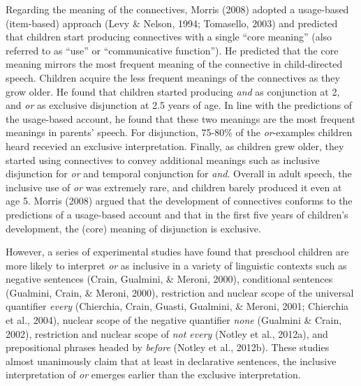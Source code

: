 \documentclass[,man,floatsintext]{apa6}
\begin{document}
Regarding the meaning of the connectives, Morris (2008) adopted a usage-based (item-based) approach (Levy \& Nelson, 1994; Tomasello, 2003) and predicted that children start producing connectives with a single \enquote{core meaning} (also referred to as \enquote{use} or \enquote{communicative function}). He predicted that the core meaning mirrors the most frequent meaning of the connective in child-directed speech. Children acquire the less frequent meanings of the connectives as they grow older. He found that children started producing \emph{and} as conjunction at 2, and \emph{or} as exclusive disjunction at 2.5 years of age. In line with the predictions of the usage-based account, he found that these two meanings are the most frequent meanings in parents' speech. For disjunction, 75-80\% of the \emph{or}-examples children heard recevied an exclusive interpretation. Finally, as children grew older, they started using connectives to convey additional meanings such as inclusive disjunction for \emph{or} and temporal conjunction for \emph{and}. Overall in adult speech, the inclusive use of \emph{or} was extremely rare, and children barely produced it even at age 5. Morris (2008) argued that the development of connectives conforms to the predictions of a usage-based account and that in the first five years of children's development, the (core) meaning of disjunction is exclusive.

However, a series of experimental studies have found that preschool children are more likely to interpret \emph{or} as inclusive in a variety of linguistic contexts such as negative sentences (Crain, Gualmini, \& Meroni, 2000), conditional sentences (Gualmini, Crain, \& Meroni, 2000), restriction and nuclear scope of the universal quantifier \emph{every} (Chierchia, Crain, Guasti, Gualmini, \& Meroni, 2001; Chierchia et al., 2004), nuclear scope of the negative quantifier \emph{none} (Gualmini \& Crain, 2002), restriction and nuclear scope of \emph{not every} (Notley et al., 2012a), and prepositional phrases headed by \emph{before} (Notley et al., 2012b). These studies almost unanimously claim that at least in declarative sentences, the inclusive interpretation of \emph{or} emerges earlier than the exclusive interpretation.
\end{document}
